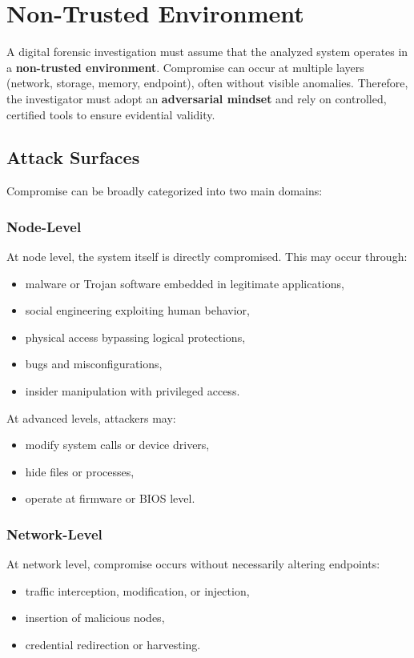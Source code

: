\section{Non-Trusted Environment}

A digital forensic investigation must assume that the analyzed system operates in a \textbf{non-trusted environment}. Compromise can occur at multiple layers (network, storage, memory, endpoint), often without visible anomalies. Therefore, the investigator must adopt an \textbf{adversarial mindset} and rely on controlled, certified tools to ensure evidential validity.

\subsection{Attack Surfaces}

Compromise can be broadly categorized into two main domains:

\subsubsection*{Node-Level}

At node level, the system itself is directly compromised. This may occur through:
\begin{itemize}
    \item malware or Trojan software embedded in legitimate applications,
    \item social engineering exploiting human behavior,
    \item physical access bypassing logical protections,
    \item bugs and misconfigurations,
    \item insider manipulation with privileged access.
\end{itemize}

\noindent
At advanced levels, attackers may:
\begin{itemize}
    \item modify system calls or device drivers,
    \item hide files or processes,
    \item operate at firmware or BIOS level.
\end{itemize}

\subsubsection*{Network-Level}

At network level, compromise occurs without necessarily altering endpoints:
\begin{itemize}
    \item traffic interception, modification, or injection,
    \item insertion of malicious nodes,
    \item credential redirection or harvesting.
\end{itemize}


